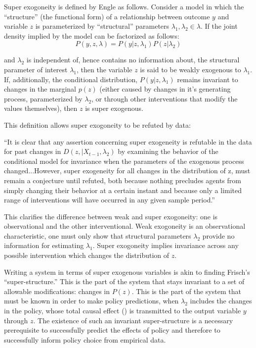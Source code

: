 \documentclass[a4paper,12pt]{article}
\begin{document}
Super exogoneity is defined by Engle as follows. Consider a model in which the ``structure'' (the functional form) of a relationship between outcome $y$ and variable $z$ is parameterized by ``structural'' parameters $\lambda_1, \lambda_2 \in \lambda$. If the joint density implied by the model can be factorized as follows:
%
$$
P(y, z, \lambda) = P(y | z, \lambda_1)P(z | \lambda_2)
$$

and $\lambda_2$ is independent of, hence contains no information about, the structural parameter of interest $\lambda_1$, then the variable $z$ is said to be weakly exogenous to $\lambda_1$. If, additionally, the conditional distribution, $P(y | z, \lambda_1)$ remains invariant to changes in the marginal $p(z)$ (either caused by changes in it's generating process, parameterized by $\lambda_2$, or through other interventions that modify the values themselves), then $z$ is super exogenous. 

This definition allows super exogoneity to be refuted by data:

\begin{displayquote}
``It is clear that any assertion concerning super exogeneity is refutable in the data for past changes in $D(z, | X_{t-1}, \lambda_2)$ by examining the behavior of the conditional model for invariance when the parameters of the exogenous process changed...However, super exogeneity for all changes in the distribution of z, must remain a conjecture until refuted, both because nothing precludes agents from simply changing their behavior at a certain instant and because only a limited range of interventions will have occurred in any given sample period.''
\end{displayquote}

This clarifies the difference between weak and super exogoneity: one is observational and the other interventional. Weak exogoneity is an observational characteristic, one must only show that structural parameters $\lambda_2$ provide no information for estimating $\lambda_1$. Super exogoneity implies invariance across any possible intervention which changes the distribution of $z$. 

Writing a system in terms of super exogenous variables is akin to finding Frisch's ``super-structure.'' This is the part of the system that stays invariant to a set of allowable modifications: changes in $P(z)$. This is the part of the system that must be known in order to make policy predictions, when $\lambda_2$ includes the changes in the policy, whose total causal effect (\cite[in the sense of][]{Pearl2000}) is transmitted to the output variable $y$ through $z$. The existence of such an invariant super-structure is a necessary prerequisite to successfully predict the effects of policy and therefore to successfully inform policy choice from empirical data.
\end{document}
